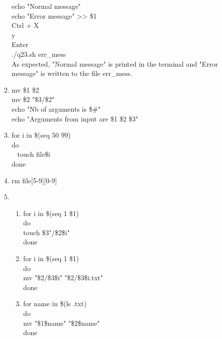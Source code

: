 \documentclass{article}
\begin{document}
\begin{enumerate}
    echo "Normal message" \\
    echo "Error message" >> \$1 \\
    Ctrl + X \\
    y \\
    Enter \\
    ./q23.sh err\_mess \\
    As expected, "Normal message" is printed in the terminal and "Error message" is written to the file err\_mess.
    \item mv \$1 \$2 \\
    mv \$2 "\$3/\$2" \\
    echo "Nb of arguments is \$\#" \\
    echo "Arguments from input are \$1 \$2 \$3"
    \item for i in \$(seq 50 99) \\
    do \\
    \mbox{  } touch file\$i \\
    done
    \item rm file[5-9][0-9]
    \item \begin{enumerate}
      \item for i in \$(seq 1 \$1) \\
      do \\
      \text{ } touch \$3"/\$2\$i" \\
      done
      \item for i in \$(seq 1 \$1) \\
      do \\
      \text{ } mv "\$2/\$3\$i" "\$2/\$3\$i.txt" \\
      done
      \item for name in \$(ls \*.txt) \\
      do \\
      \text{ } mv "\$1\$name" "\$2\$name" \\
      done
    \end{enumerate}
\end{enumerate}
\end{document}
